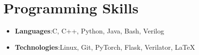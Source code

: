 \documentclass[letterpaper,11pt]{article}
\newcommand{\pubItem}[1]{\vspace{-1pt}\item #1\vspace{-5pt}}
\newcommand{\resumeSubHeadingListStart}{\begin{itemize}[leftmargin=*]}
\newcommand{\resumeSubHeadingListEnd}{\end{itemize}}
\begin{document}


%
\section{Programming Skills}
    \resumeSubHeadingListStart
        \item {\textbf{Languages}:\space C, C++, Python, Java, Bash, Verilog}
        \item {\textbf{Technologies}:\space Linux, Git, PyTorch, Flask, Verilator, \LaTeX}
    \resumeSubHeadingListEnd


\end{document}
